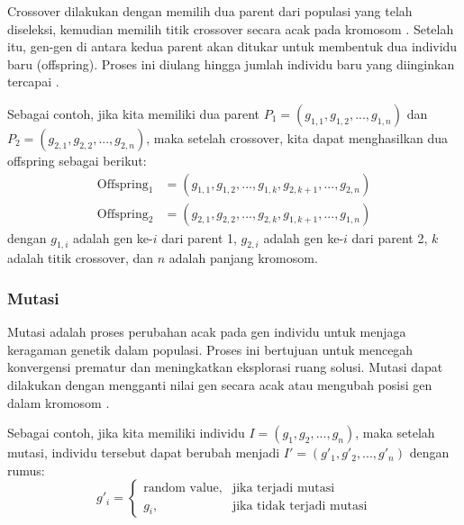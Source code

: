 Crossover dilakukan dengan memilih dua parent dari populasi yang telah diseleksi, kemudian memilih titik crossover secara acak pada kromosom \cite{Fadhilah2016RepresentasiMU}. Setelah itu, gen-gen di antara kedua parent akan ditukar untuk membentuk dua individu baru (offspring). Proses ini diulang hingga jumlah individu baru yang diinginkan tercapai \cite{Muliantara2013ANALISISDI}.

Sebagai contoh, jika kita memiliki dua parent $P_1 = (g_{1,1}, g_{1,2}, ..., g_{1,n})$ dan $P_2 = (g_{2,1}, g_{2,2}, ..., g_{2,n})$, maka setelah crossover, kita dapat menghasilkan dua offspring sebagai berikut:
\begin{equation}
	\begin{aligned}
		\text{Offspring}_1 &= (g_{1,1}, g_{1,2}, ..., g_{1,k}, g_{2,k+1}, ..., g_{2,n}) \\
		\text{Offspring}_2 &= (g_{2,1}, g_{2,2}, ..., g_{2,k}, g_{1,k+1}, ..., g_{1,n})
	\end{aligned}
	\label{eq:ga-crossover}
\end{equation}
dengan $g_{1,i}$ adalah gen ke-$i$ dari parent 1, $g_{2,i}$ adalah gen ke-$i$ dari parent 2, $k$ adalah titik crossover, dan $n$ adalah panjang kromosom.
\vspace{0.5em}
\noindent

\subsubsection{Mutasi} \label{II.GA.Mutasi}
Mutasi adalah proses perubahan acak pada gen individu untuk menjaga keragaman genetik dalam populasi. Proses ini bertujuan untuk mencegah konvergensi prematur dan meningkatkan eksplorasi ruang solusi. Mutasi dapat dilakukan dengan mengganti nilai gen secara acak atau mengubah posisi gen dalam kromosom \cite{Ongko2017}.

Sebagai contoh, jika kita memiliki individu $I = (g_1, g_2, ..., g_n)$, maka setelah mutasi, individu tersebut dapat berubah menjadi $I' = (g'_1, g'_2, ..., g'_n)$ dengan rumus:
\begin{equation}
	g'_i = 
	\begin{cases}
		\text{random value}, & \text{jika terjadi mutasi} \\
		g_i, & \text{jika tidak terjadi mutasi}
	\end{cases}
	\label{eq:ga-mutation}
\end{equation}

